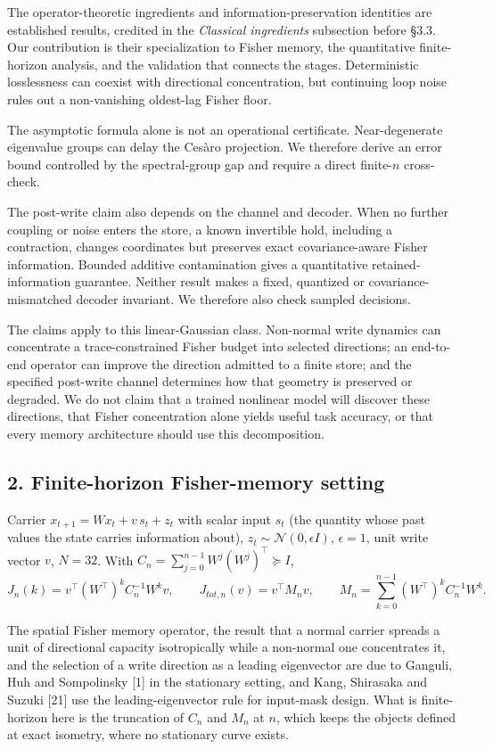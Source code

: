 \documentclass[
  10pt,
]{article}
\begin{document}
The operator-theoretic ingredients and information-preservation
identities are established results, credited in the \emph{Classical
ingredients} subsection before §3.3. Our contribution is their
specialization to Fisher memory, the quantitative finite-horizon
analysis, and the validation that connects the stages. Deterministic
losslessness can coexist with directional concentration, but continuing
loop noise rules out a non-vanishing oldest-lag Fisher floor.

The asymptotic formula alone is not an operational certificate.
Near-degenerate eigenvalue groups can delay the Cesàro projection. We
therefore derive an error bound controlled by the spectral-group gap and
require a direct finite-\(n\) cross-check.

The post-write claim also depends on the channel and decoder. When no
further coupling or noise enters the store, a known invertible hold,
including a contraction, changes coordinates but preserves exact
covariance-aware Fisher information. Bounded additive contamination
gives a quantitative retained-information guarantee. Neither result
makes a fixed, quantized or covariance-mismatched decoder invariant. We
therefore also check sampled decisions.

The claims apply to this linear-Gaussian class. Non-normal write
dynamics can concentrate a trace-constrained Fisher budget into selected
directions; an end-to-end operator can improve the direction admitted to
a finite store; and the specified post-write channel determines how that
geometry is preserved or degraded. We do not claim that a trained
nonlinear model will discover these directions, that Fisher
concentration alone yields useful task accuracy, or that every memory
architecture should use this decomposition.

\subsection{2. Finite-horizon Fisher-memory
setting}\label{finite-horizon-fisher-memory-setting}

Carrier \(x_{t+1}=Wx_t+v\,s_t+z_t\) with scalar input \(s_t\) (the
quantity whose past values the state carries information about),
\(z_t\sim\mathcal N(0,\epsilon I)\), \(\epsilon=1\), unit write vector
\(v\), \(N=32\). With \(C_n=\sum_{j=0}^{n-1}W^j(W^j)^\top\succeq I\),
\[J_n(k)=v^\top(W^\top)^kC_n^{-1}W^kv,\qquad J_{tot,n}(v)=v^\top M_nv,\qquad M_n=\sum_{k=0}^{n-1}(W^\top)^kC_n^{-1}W^k.\]

The spatial Fisher memory operator, the result that a normal carrier
spreads a unit of directional capacity isotropically while a non-normal
one concentrates it, and the selection of a write direction as a leading
eigenvector are due to Ganguli, Huh and Sompolinsky {[}1{]} in the
stationary setting, and Kang, Shirasaka and Suzuki {[}21{]} use the
leading-eigenvector rule for input-mask design. What is finite-horizon
here is the truncation of \(C_n\) and \(M_n\) at \(n\), which keeps the
objects defined at exact isometry, where no stationary curve exists.
\end{document}
